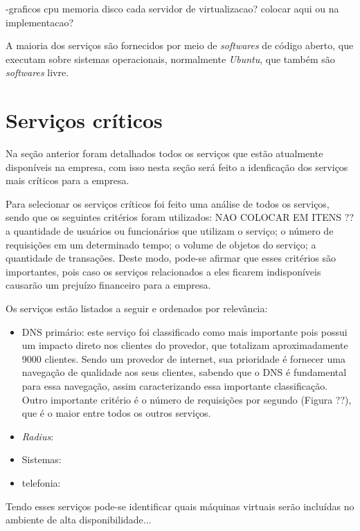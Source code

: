 -graficos cpu memoria disco cada servidor de virtualizacao? colocar aqui ou na implementacao?

A maioria dos serviços são fornecidos por meio de \textit{softwares} de código aberto, que executam sobre sistemas operacionais, normalmente 
\textit{Ubuntu}, que também são \textit{softwares} livre.

\section{Serviços críticos}
\label{section:servcrit}

Na seção anterior foram detalhados todos os serviços que estão atualmente disponíveis na empresa, com isso nesta seção será feito a idenficação
dos serviços mais críticos para a empresa.

Para selecionar os serviços críticos foi feito uma análise de todos os serviços, sendo que os seguintes critérios foram utilizados: NAO COLOCAR EM ITENS ?? 
a quantidade de usuários ou funcionários que utilizam o serviço; 
o número de requisições em um determinado tempo;
o volume de objetos do serviço;
a quantidade de transações.
Deste modo, pode-se afirmar que esses critérios são importantes, pois caso os serviços relacionados a eles ficarem indisponíveis causarão 
um prejuízo financeiro para a empresa. 

Os serviços estão listados a seguir e ordenados por relevância:
\begin{itemize}
 \item \ac{DNS} primário: este serviço foi classificado como mais importante pois possui um impacto direto nos clientes do provedor, que 
 totalizam aproximadamente 9000 clientes. Sendo um provedor de internet, sua prioridade é fornecer uma navegação de qualidade aos seus clientes, 
 sabendo que o \ac{DNS} é fundamental para essa navegação, assim caracterizando essa importante classificação. Outro importante critério é
 o número de requisições por segundo (Figura ??), que é o maior entre todos os outros serviços.
 \item \textit{Radius}: 
 \item Sistemas: 
 \item telefonia: 
\end{itemize}

Tendo esses serviços pode-se identificar quais máquinas virtuais serão incluídas no ambiente de alta disponibilidade...


